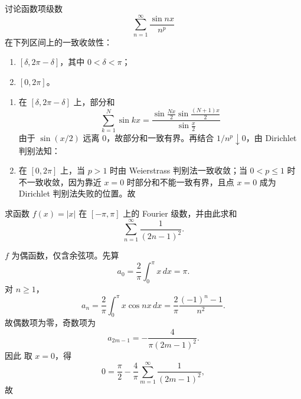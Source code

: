 \begin{question}
讨论函数项级数
\[
\sum_{n=1}^{\infty}\frac{\sin nx}{n^p}
\]
在下列区间上的一致收敛性：
\begin{enumerate}[label=（\arabic*）,leftmargin=2.8em,itemsep=0.2em]
\item $[\delta,2\pi-\delta]$，其中 $0<\delta<\pi$；
\item $[0,2\pi]$。
\end{enumerate}
\begin{solution}

\begin{enumerate}[label=（\arabic*）,leftmargin=2.8em,itemsep=0.2em]
\item 在 $[\delta,2\pi-\delta]$ 上，部分和
\[
\sum_{k=1}^{N}\sin kx=\frac{\sin\frac{Nx}{2}\sin\frac{(N+1)x}{2}}{\sin\frac{x}{2}}
\]
由于 $\sin(x/2)$ 远离 $0$，故部分和一致有界。再结合 $1/n^p\downarrow0$，由 Dirichlet 判别法知：
\item 在 $[0,2\pi]$ 上，当 $p>1$ 时由 Weierstrass 判别法一致收敛；当 $0<p\le1$ 时不一致收敛，因为靠近 $x=0$ 时部分和不能一致有界，且点 $x=0$ 成为 Dirichlet 判别法失败的位置。故
\end{enumerate}
\end{solution}
\end{question}

\begin{question}
求函数 $f(x)=|x|$ 在 $[-\pi,\pi]$ 上的 Fourier 级数，并由此求和
\[
\sum_{n=1}^{\infty}\frac{1}{(2n-1)^2}.
\]

\begin{solution}

$f$ 为偶函数，仅含余弦项。先算
\[
a_0=\frac{2}{\pi}\int_0^{\pi}x\,dx=\pi.
\]
对 $n\ge1$，
\[
a_n=\frac{2}{\pi}\int_0^{\pi}x\cos nx\,dx
=\frac{2}{\pi}\frac{(-1)^n-1}{n^2}.
\]
故偶数项为零，奇数项为
\[
a_{2m-1}=-\frac{4}{\pi(2m-1)^2}.
\]
因此
取 $x=0$，得
\[
0=\frac{\pi}{2}-\frac{4}{\pi}\sum_{m=1}^{\infty}\frac{1}{(2m-1)^2},
\]
故
\end{solution}
\end{question}

